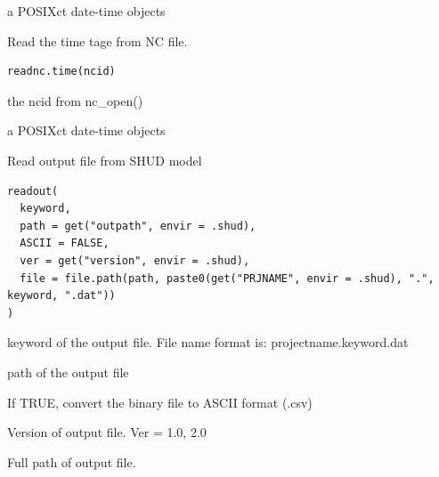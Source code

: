 \documentclass[a4paper]{book}
\begin{document}
%
\begin{Value}
a POSIXct date-time objects
\end{Value}
%
\begin{Description}\relax
Read the time tage from NC file.
\end{Description}
%
\begin{Usage}
\begin{verbatim}
readnc.time(ncid)
\end{verbatim}
\end{Usage}
%
\begin{Arguments}
\begin{ldescription}
\item[\code{ncid}] the ncid from nc\_open()
\end{ldescription}
\end{Arguments}
%
\begin{Value}
a POSIXct date-time objects
\end{Value}
%
\begin{Description}\relax
Read output file from SHUD model
\end{Description}
%
\begin{Usage}
\begin{verbatim}
readout(
  keyword,
  path = get("outpath", envir = .shud),
  ASCII = FALSE,
  ver = get("version", envir = .shud),
  file = file.path(path, paste0(get("PRJNAME", envir = .shud), ".", keyword, ".dat"))
)
\end{verbatim}
\end{Usage}
%
\begin{Arguments}
\begin{ldescription}
\item[\code{keyword}] keyword of the output file. File name format is: projectname.keyword.dat

\item[\code{path}] path of the output file

\item[\code{ASCII}] If TRUE, convert the binary file to ASCII format (.csv)

\item[\code{ver}] Version of output file. Ver = 1.0, 2.0

\item[\code{file}] Full path of output file.
\end{ldescription}
\end{Arguments}
\end{document}

